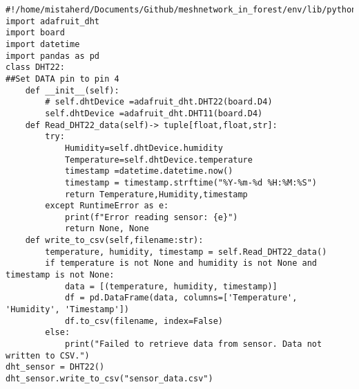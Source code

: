 \begin{lstlisting}[style=mystyle,caption={DHT22code}]
#!/home/mistaherd/Documents/Github/meshnetwork_in_forest/env/lib/python3.11
import adafruit_dht 
import board
import datetime
import pandas as pd
class DHT22:
##Set DATA pin to pin 4
    def __init__(self):
        # self.dhtDevice =adafruit_dht.DHT22(board.D4)
        self.dhtDevice =adafruit_dht.DHT11(board.D4)
    def Read_DHT22_data(self)-> tuple[float,float,str]:
        try:
            Humidity=self.dhtDevice.humidity
            Temperature=self.dhtDevice.temperature
            timestamp =datetime.datetime.now()
            timestamp = timestamp.strftime("%Y-%m-%d %H:%M:%S")
            return Temperature,Humidity,timestamp
        except RuntimeError as e:
            print(f"Error reading sensor: {e}")
            return None, None
    def write_to_csv(self,filename:str):
        temperature, humidity, timestamp = self.Read_DHT22_data()
        if temperature is not None and humidity is not None and timestamp is not None:
            data = [(temperature, humidity, timestamp)]
            df = pd.DataFrame(data, columns=['Temperature', 'Humidity', 'Timestamp'])
            df.to_csv(filename, index=False)
        else:
            print("Failed to retrieve data from sensor. Data not written to CSV.")
dht_sensor = DHT22()
dht_sensor.write_to_csv("sensor_data.csv")
\end{lstlisting}